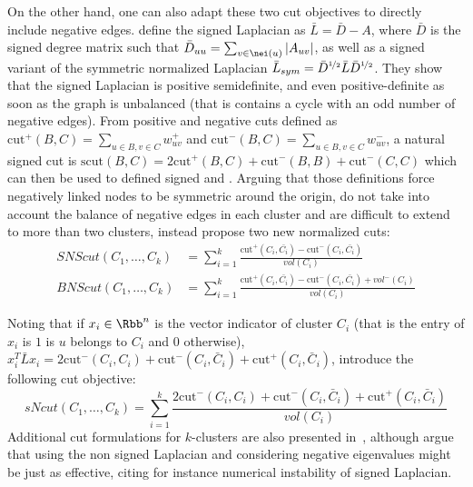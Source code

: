 On the other hand, one can also adapt these two cut objectives to directly include negative edges.
\Textcite{Luca10} define the signed Laplacian as $\bar{L} = \bar{D} - A$, where $\bar{D}$ is the
signed degree matrix such that $\bar{D}_{uu} = \sum_{v\in \nei(u)} |A_{uv}|$, as well as a signed
variant of the symmetric normalized Laplacian $\bar{L}_{sym}  = \bar{D}^{\nicefrac{1}{2}} \bar{L}
\bar{D}^{\nicefrac{1}{2}}$. They show that the signed Laplacian is positive semidefinite, and
even positive-definite as soon as the graph is unbalanced (that is contains a cycle with an odd
number of negative edges). From positive and negative cuts defined as $\mathrm{cut}^+(B, C) =
\sum_{u\in B, v\in C} w^+_{uv}$ and $\mathrm{cut}^-(B, C) = \sum_{u\in B, v\in C} w^-_{uv}$, a
natural signed cut is $\mathrm{scut}(B, C) = 2\mathrm{cut}^+(B, C) + \mathrm{cut}^-(B, B) +
\mathrm{cut}^-(C, C)$ which can then be used to defined signed \rcut{} and \ncut{}. Arguing that those
definitions force negatively linked nodes to be symmetric around the origin, do not take into
account the balance of negative edges in each cluster and are difficult to extend to more than two
clusters, \textcite{SignedEmbedding15} instead propose two new normalized cuts:
\begin{align*}
  SNScut(C_1, \ldots, C_k) &= \sum_{i=1}^k
  \frac{\mathrm{cut}^+(C_i, \bar{C_i})-\mathrm{cut}^-(C_i, \bar{C_i})}{vol(C_i)}  \\
  BNScut(C_1, \ldots, C_k) &= \sum_{i=1}^k
  \frac{\mathrm{cut}^+(C_i, \bar{C_i})-\mathrm{cut}^-(C_i, \bar{C_i})+vol^-(C_i)}{vol(C_i)}
\end{align*}

Noting that if $x_i\in\Rbb^n$ is the vector indicator of cluster $C_i$ (that is the \uth{} entry of
$x_i$ is $1$ is $u$ belongs to $C_i$ and $0$ otherwise), $x_i^T\bar{L}x_i = 2\mathrm{cut}^-(C_i,
C_i) + \mathrm{cut}^-(C_i, \bar{C}_i) + \mathrm{cut}^+(C_i, \bar{C}_i)$,
\textcite{mSemanticWordCC17} introduce the following cut objective:
\begin{equation*}
  sNcut(C_1, \ldots, C_k) = \sum_{i=1}^k
  \frac{2\mathrm{cut}^-(C_i, C_i) + \mathrm{cut}^-(C_i, \bar{C}_i) + \mathrm{cut}^+(C_i, \bar{C}_i)}{vol(C_i)}
\end{equation*}
Additional cut formulations for $k$-clusters are also presented in~\autocite{moreSignedCut12},
although \textcite{Knyazev2017l} argue that using the non signed Laplacian and considering negative
eigenvalues might be just as effective, citing for instance numerical instability of signed
Laplacian.

